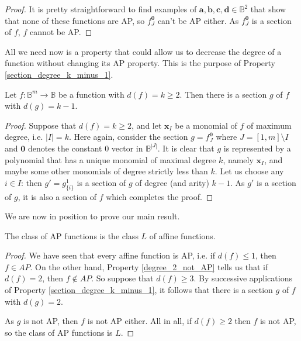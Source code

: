 \begin{proof}
  It is pretty straightforward to find examples of $\mathbf{a}, \mathbf{b},
  \mathbf{c}, \mathbf{d} \in \mathbb{B}^2$
  that show that none of these functions are AP, so $f^{\mathbf{0}}_J$ can't
  be AP either. As $f^{\mathbf{0}}_J$ is a section of $f$, $f$ cannot be AP.
\end{proof}

All we need now is a property that could allow us to decrease the degree of a
function without changing its AP property. This is the purpose of
Property \ref{section_degree_k_minus_1}.

\begin{property}\label{section_degree_k_minus_1}
Let $f:\mathbb{B}^m\rightarrow \mathbb{B}$ be a function with
  $d(f)=k\geq 2$. Then there is a section $g$ of $f$ with $d(g)=k-1$.
\end{property}
\begin{proof}
Suppose that  $d(f)=k\geq 2$, and let $\mathbf{x}_I$ be a monomial of $f$ of
  maximum degree, i.e. $|I|=k$.  Here again, consider the section $g =
  f^{\mathbf{0}}_J$ where $J = [1, m] \setminus I$ and $\mathbf{0}$ denotes the
  constant $0$ vector in $\mathbb{B}^{|J|}$. It is clear that $g$ is
  represented by a  polynomial that has a unique monomial of maximal degree
  $k$, namely $\mathbf{x}_I$, and maybe some other monomials of degree strictly
  less than $k$.  Let us choose any $i \in I$: then $g' = g^1_{\{i\}}$ is a
  section of $g$ of degree (and arity) $k-1$. As $g'$ is a section of $g$, it
  is also a section of $f$ which completes the proof.
\end{proof}

We are now in position to prove our main result.

\begin{proposition}\label{AP_is_L}
The class of AP functions is the class $L$ of affine functions.
\end{proposition}
\begin{proof}
We have seen that every affine function is AP, i.e. if $d(f)\leq 1$, then $f\in
  AP$. On the other hand, Property \ref{degree_2_not_AP} tells us that if
  $d(f)=2$, then $f \notin AP$. So suppose that  $d(f)\geq 3$. By successive
  applications of Property \ref{section_degree_k_minus_1}, it follows that
  there is a section $g$ of $f$ with $d(g)=2$.

  As $g$ is not AP, then $f$ is not AP either. All in all, if $d(f) \geq 2$
  then $f$ is not AP, so the class of AP functions is $L$.
\end{proof}

